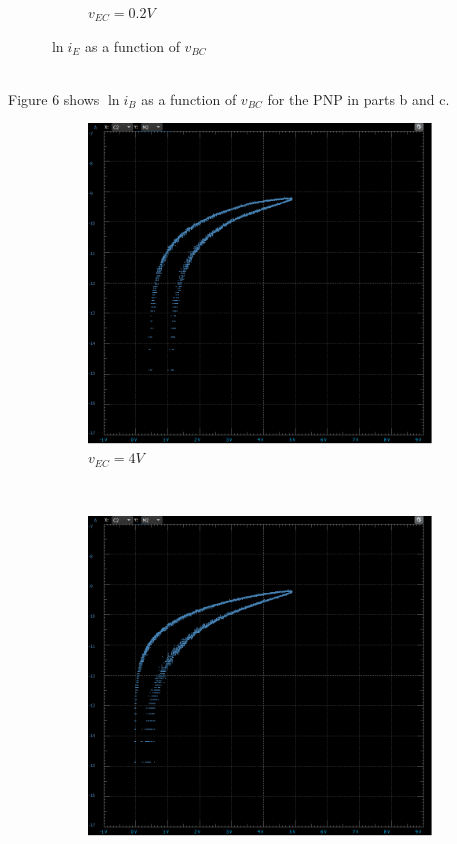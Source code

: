 \documentclass[12pt]{article}
\begin{document}
\begin{enumerate}
\begin{enumerate}
\begin{figure}[h!]
\begin{subfigure}[b]{0.48\textwidth}
                \caption{$v_{EC} = 0.2V$}
            \end{subfigure}
            \caption{$\ln i_E$ as a function of $v_{BC}$}
        \end{figure} \\
        Figure 6 shows $\ln i_B$ as a function of $v_{BC}$ for the PNP in parts b and c. \\
        \begin{figure}[h!]
            \centering
            \begin{subfigure}[b]{0.48\textwidth}
                \includegraphics[width=\textwidth]{PBB4.png}
                \caption{$v_{EC} = 4V$}
            \end{subfigure}
            ~
            \begin{subfigure}[b]{0.48\textwidth}
                \includegraphics[width=\textwidth]{PCB02.png}

\end{subfigure}
\end{figure}
\end{enumerate}
\end{enumerate}
\end{document}
